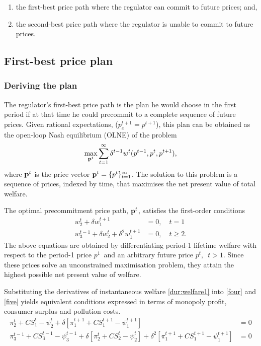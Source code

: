 \begin{enumerate}
\item the first-best price path where the regulator can commit to  future
prices; and,

\item the second-best price path where the regulator is unable to  commit to
future prices.
\end{enumerate}

\subsection{First-best price plan}

\label{sec:first-best-price}

\subsubsection{Deriving the plan}

\label{sec:deriving-path}

The regulator's first-best price path is the plan he would choose in the
first period if at that time he could precommit to a complete sequence of
future prices. Given rational expectations, ($p_{e}^{t+1}=p^{t+1}$), this
plan can be obtained as the open-loop Nash equilibrium (OLNE) of the problem 
\begin{equation}
\max_{\mathbf{p}^{t}}\sum_{t=1}^{\infty }\delta
^{t-1}w^{t}(p^{t-1},p^{t},p^{t+1})\text{,}  \label{eq:13}
\end{equation}%
where $\mathbf{p}^{t}$ is the price vector $\vect{p}^{t}=\{p^{t}\}_{t=1}^{%
\infty }$. The solution to this problem is a sequence of prices, indexed by
time, that maximises the net present value of total welfare.

The optimal precommitment price path, $\mathbf{p}^{t}$, satisfies the
first-order conditions 
\begin{align}
w_{2}^{t}+\delta w_{1}^{t+1}& =0,\quad t=1  \label{four} \\
w_{3}^{t-1}+\delta w_{2}^{t}+\delta ^{2}w_{1}^{t+1}& =0,\quad t\geq 2.
\label{five}
\end{align}%
The above equations are obtained by differentiating period-1 lifetime
welfare with respect to the period-1 price $p^{1}$\ and an arbitrary future
price $p^{t},$\ $t>1$. Since these prices solve an unconstrained
maximisation problem, they attain the highest possible net present value of
welfare.

Substituting the derivatives of instantaneous welfare \eqref{dur:welfare1}
into \eqref{four} and \eqref{five} yields equivalent conditions expressed in
terms of monopoly profit, consumer surplus and pollution costs. 
\begin{align}
\pi _{2}^{t}+CS_{1}^{t}-\psi _{2}^{t}+\delta \left[ \pi
_{1}^{t+1}+CS_{1}^{t+1}-\psi _{1}^{t+1}\right] & =0  \label{eq:14} \\
\pi _{3}^{t-1}+CS_{3}^{t-1}-\psi _{3}^{t-1}+\delta \left[ \pi
_{2}^{t}+CS_{2}^{t}-\psi _{2}^{t}\right] +\delta ^{2}\left[ \pi
_{1}^{t+1}+CS_{1}^{t+1}-\psi _{1}^{t+1}\right] & =0  \label{eq:15'}
\end{align}

